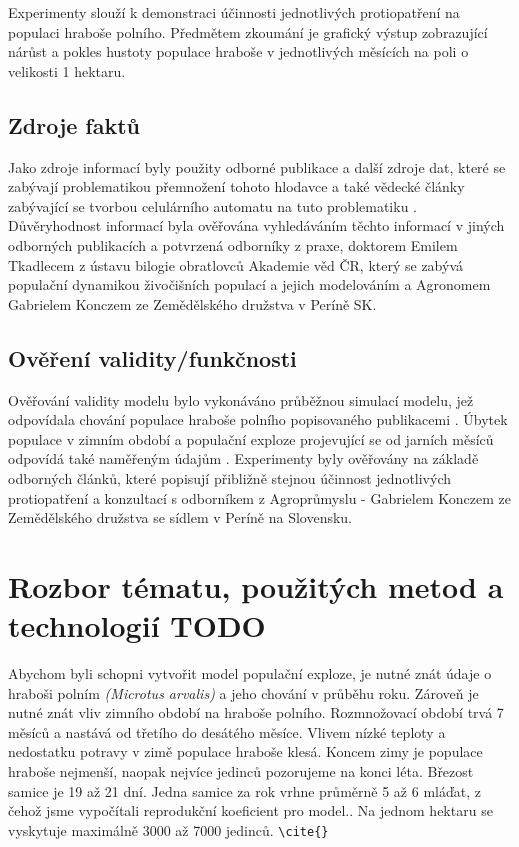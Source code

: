 \documentclass[a4paper,11pt]{article}
\begin{document}
Experimenty slouží k demonstraci účinnosti jednotlivých protiopatření na populaci hraboše polního. Předmětem zkoumání je grafický výstup zobrazující nárůst  a  pokles hustoty populace hraboše v jednotlivých měsících na poli o velikosti 1 hektaru. 

\subsection{Zdroje faktů}
Jako zdroje informací byly použity odborné publikace\cite{prubehvyvoje} a další zdroje dat\cite{letak}, které se zabývají problematikou přemnožení tohoto hlodavce a také vědecké články zabývající se tvorbou celulárního automatu na tuto problematiku \cite{OurCA}. Důvěryhodnost informací byla ověřována vyhledáváním těchto informací v jiných odborných publikacích \cite{fluktuace} \cite{prubehvyvoje} a potvrzená odborníky z praxe, doktorem Emilem Tkadlecem z ústavu bilogie obratlovců Akademie věd ČR, který se zabývá populační dynamikou živočišních populací a jejich modelováním a Agronomem Gabrielem Konczem ze Zemědělského družstva v Períně SK.

\subsection{Ověření validity/funkčnosti}
Ověřování validity modelu bylo vykonáváno průběžnou simulací modelu, jež odpovídala chování populace hraboše polního popisovaného publikacemi \cite{letak}\cite{fluktuace}\cite{prubehvyvoje}\cite{Voles-popul-data:online}\cite{diplom-Tkadlec}. Úbytek populace v zimním období a populační exploze projevující se od jarních měsíců odpovídá také naměřeným údajům \cite{Winter-temp:online}. Experimenty byly ověřovány na základě odborných článků, které popisují přibližně stejnou účinnost jednotlivých protiopatření a konzultací s odborníkem z Agroprůmyslu - Gabrielem Konczem ze Zemědělského družstva se sídlem v Períně na Slovensku.   

\section{Rozbor tématu, použitých metod a technologií TODO}
Abychom byli schopni vytvořit model populační exploze, je nutné znát údaje o hraboši polním \textit{(Microtus arvalis)} a jeho chování v průběhu roku.
 Zároveň je nutné znát vliv zimního období na hraboše polního. Rozmnožovací období trvá 7 měsíců a nastává od třetího do desátého měsíce.\cite{diplom-Tkadlec} Vlivem nízké teploty a nedostatku potravy v zimě populace hraboše klesá. Koncem zimy je populace hraboše nejmenší, naopak nejvíce jedinců pozorujeme na konci léta.\cite{Winter-temp:online} Březost samice je 19 až 21 dní. Jedna samice za rok vrhne průměrně 5 až 6 mláďat\cite{diplom-Tkadlec}, z čehož jsme vypočítali reprodukční koeficient pro model.\cite{OurCA}. Na jednom hektaru se vyskytuje maximálně 3000 až 7000 jedinců. \verb|\cite{}|
\end{document}
